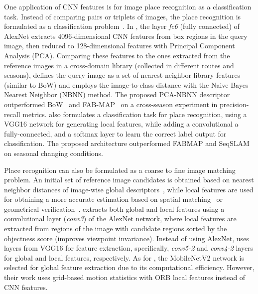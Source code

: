 One application of CNN features is for image place recognition as a classification task. Instead of comparing pairs or triplets of images, the place recognition is formulated as a classification problem~\parencite{chen-et-al:2018:2859916}.
In \cite{taisho-kanji:2016:7866383}, the layer \textit{fc6} (fully connected) of AlexNet extracts 4096-dimensional CNN features from box regions in the query image, then reduced to 128-dimensional features with Principal Component Analysis (PCA). Comparing these features to the ones extracted from the reference images in a cross-domain library (collected in different routes and seasons), \cite{taisho-kanji:2016:7866383} defines the query image as a set of nearest neighbor library features (similar to BoW) and employs the image-to-class distance with the Naive Bayes Nearest Neighbor (NBNN) method. The proposed PCA-NBNN descriptor outperformed BoW~\parencite{discussion:bow} and FAB-MAP~\parencite{discussion:fab-map} on a cross-season experiment in precision-recall metrics.
\cite{chen-et-al:2018:2859916} also formulates a classification task for place recognition, using a VGG16 network for generating local features, while adding a convolutional a fully-connected, and a softmax layer to learn the correct label output for classification. The proposed architecture outperformed FABMAP and SeqSLAM~\parencite{discussion:seqslam} on seasonal changing conditions.

Place recognition can also be formulated as a coarse to fine image matching problem. An initial set of reference image candidates is obtained based on nearest neighbor distances of image-wise global descriptors~\parencite{xin-et-al:2017:8310121,camara-et-al:2020:9196967,liu-et-al:2021:9561126}, while local features are used for obtaining a more accurate estimation based on spatial matching~\parencite{xin-et-al:2017:8310121,camara-et-al:2020:9196967} or geometrical verification~\parencite{liu-et-al:2021:9561126}.
\cite{xin-et-al:2017:8310121} extracts both global and local features using a convolutional layer (\textit{conv3}) of the AlexNet network, where local features are extracted from regions of the image with candidate regions sorted by the objectness score (improves viewpoint invariance).
Instead of using AlexNet, \cite{camara-et-al:2020:9196967} uses layers from VGG16 for feature extraction, specifically, \textit{conv5-2} and \textit{conv4-2} layers for global and local features, respectively.
As for \cite{liu-et-al:2021:9561126}, the MobileNetV2 network is selected for global feature extraction due to its computational efficiency. However, their work uses grid-based motion statistics with ORB local features instead of CNN features.

